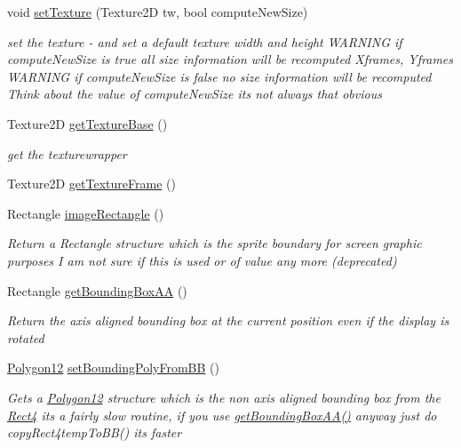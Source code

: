 \begin{DoxyCompactItemize}
void \mbox{\hyperlink{class_r_c___framework_1_1_sprite3_a95f9492fffdbd603d9aa087b4bc108f4}{set\+Texture}} (Texture2D tw, bool compute\+New\+Size)
\begin{DoxyCompactList}\small\item\em set the texture -\/ and set a default texture width and height W\+A\+R\+N\+I\+NG if compute\+New\+Size is true all size information will be recomputed Xframes, Yframes W\+A\+R\+N\+I\+NG if compute\+New\+Size is false no size information will be recomputed Think about the value of compute\+New\+Size its not always that obvious \end{DoxyCompactList}\item 
Texture2D \mbox{\hyperlink{class_r_c___framework_1_1_sprite3_a32b080ce4ed442a34af48551b05c4847}{get\+Texture\+Base}} ()
\begin{DoxyCompactList}\small\item\em get the texturewrapper \end{DoxyCompactList}\item 
Texture2D \mbox{\hyperlink{class_r_c___framework_1_1_sprite3_a5a3eda5b5e64a44638051ece772411ca}{get\+Texture\+Frame}} ()
\item 
Rectangle \mbox{\hyperlink{class_r_c___framework_1_1_sprite3_a438ffa0b834a51a9f9cf35e372457d41}{image\+Rectangle}} ()
\begin{DoxyCompactList}\small\item\em Return a Rectangle structure which is the sprite boundary for screen graphic purposes I am not sure if this is used or of value any more (deprecated) \end{DoxyCompactList}\item 
Rectangle \mbox{\hyperlink{class_r_c___framework_1_1_sprite3_a1069512793423e1c5f3205d053e11d66}{get\+Bounding\+Box\+AA}} ()
\begin{DoxyCompactList}\small\item\em Return the axis aligned bounding box at the current position even if the display is rotated \end{DoxyCompactList}\item 
\mbox{\hyperlink{class_r_c___framework_1_1_polygon12}{Polygon12}} \mbox{\hyperlink{class_r_c___framework_1_1_sprite3_a9ed1e862b6f3f6a28f65b5c53fbb34e1}{set\+Bounding\+Poly\+From\+BB}} ()
\begin{DoxyCompactList}\small\item\em Gets a \mbox{\hyperlink{class_r_c___framework_1_1_polygon12}{Polygon12}} structure which is the non axis aligned bounding box from the \mbox{\hyperlink{class_r_c___framework_1_1_rect4}{Rect4}} its a fairly slow routine, if you use \mbox{\hyperlink{class_r_c___framework_1_1_sprite3_a1069512793423e1c5f3205d053e11d66}{get\+Bounding\+Box\+A\+A()}} anyway just do copy\+Rect4temp\+To\+B\+B() its faster \end{DoxyCompactList}\item 

\end{DoxyCompactItemize}
